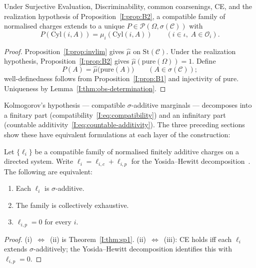 \begin{theorem}
\label{I:thm:stone-main}
Under Surjective Evaluation, Discriminability, common coarsenings,
CE, and the realization hypothesis of
Proposition~\ref{I:prop:B2}, a compatible family of normalised charges
extends to a unique $P \in \mathcal{P}(\Omega, \sigma(\mathcal{C}))$ with
\[
  P(\mathrm{Cyl}(i, A)) = \mu_i(\mathrm{Cyl}(i, A))
  \qquad (i \in \iota,\; A \in \mathcal{O}_i).
\]
\end{theorem}

\begin{proof}
Proposition~\ref{I:prop:invlim} gives $\hat{\mu}$ on
$\mathrm{St}(\mathcal{C})$.  Under the realization hypothesis,
Proposition~\ref{I:prop:B2} gives
$\hat{\mu}(\mathrm{pure}(\Omega)) = 1$.  Define
\[
  P(A) = \hat{\mu}\!\bigl(\mathrm{pure}(A)\bigr)
  \qquad (A \in \sigma(\mathcal{C}));
\]
well-definedness follows from Proposition~\ref{I:prop:B1} and
injectivity of $\mathrm{pure}$.  Uniqueness by
Lemma~\ref{I:thm:obs-determination}.
\end{proof}

\medskip

Kolmogorov's hypothesis --- compatible $\sigma$-additive marginals ---
decomposes into a finitary part
(compatibility~\eqref{I:eq:compatibility}) and an infinitary part
(countable additivity~\eqref{I:eq:countable-additivity}).  The three
preceding sections show these have equivalent formulations at each layer
of the construction:

\begin{theorem}
\label{I:thm:main}
Let $\{\ell_i\}$ be a compatible family of normalised finitely additive
charges on a directed system.  Write $\ell_i = \ell_{i,c} + \ell_{i,p}$
for the Yosida--Hewitt decomposition~\cite{YosidaHewitt1952}.  The
following are equivalent:
\begin{enumerate}[label=(\roman*)]
  \item Each $\ell_i$ is $\sigma$-additive.
  \item The family is collectively exhaustive.
  \item $\ell_{i,p} = 0$ for every $i$.
\end{enumerate}
\end{theorem}

\begin{proof}
(i)~$\Leftrightarrow$~(ii) is Theorem~\ref{I:thm:sp1}.
(ii)~$\Leftrightarrow$~(iii): CE holds iff each $\ell_i$ extends
$\sigma$-additively; the Yosida--Hewitt decomposition identifies this
with $\ell_{i,p} = 0$.
\end{proof}


